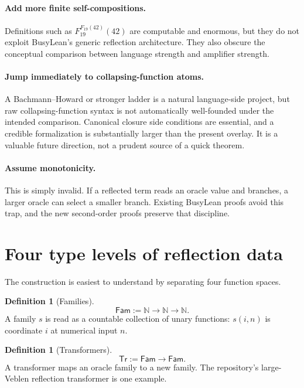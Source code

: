 \documentclass[11pt]{article}
\theoremstyle{definition}
\newtheorem{definition}[theorem]{Definition}
\theoremstyle{remark}
\newcommand{\N}{\mathbb{N}}
\newcommand{\Fam}{\mathsf{Fam}}
\newcommand{\Tr}{\mathsf{Tr}}
\begin{document}
\paragraph{Add more finite self-compositions.}
Definitions such as \(F_{19}^{F_{19}(42)}(42)\) are computable and enormous,
but they do not exploit BusyLean's generic reflection architecture.  They also
obscure the conceptual comparison between language strength and amplifier
strength.

\paragraph{Jump immediately to collapsing-function atoms.}
A Bachmann--Howard or stronger ladder is a natural language-side project, but
raw collapsing-function syntax is not automatically well-founded under the
intended comparison.  Canonical closure side conditions are essential, and a
credible formalization is substantially larger than the present overlay.  It
is a valuable future direction, not a prudent source of a quick theorem.

\paragraph{Assume monotonicity.}
This is simply invalid.  If a reflected term reads an oracle value and branches,
a larger oracle can select a smaller branch.  Existing BusyLean proofs avoid
this trap, and the new second-order proofs preserve that discipline.

\section{Four type levels of reflection data}

The construction is easiest to understand by separating four function spaces.

\begin{definition}[Families]
\[
\Fam := \N\to\N\to\N.
\]
A family \(s\) is read as a countable collection of unary functions:
\(s(i,n)\) is coordinate \(i\) at numerical input \(n\).
\end{definition}

\begin{definition}[Transformers]
\[
\Tr := \Fam\to\Fam.
\]
A transformer maps an oracle family to a new family.  The repository's
large-Veblen reflection transformer is one example.
\end{definition}
\end{document}
